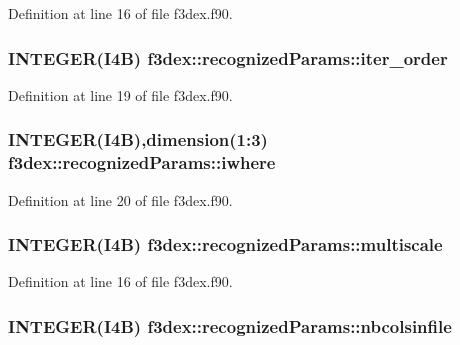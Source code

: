 Definition at line 16 of file f3dex.f90.

\hypertarget{typef3dex_1_1recognized_params_a2a6ce96f76b2a0313dfc8a7c2637664f}{
\subsubsection[{iter\_\-order}]{\setlength{\rightskip}{0pt plus 5cm}INTEGER(I4B) {\bf f3dex::recognizedParams::iter\_\-order}}}
\label{typef3dex_1_1recognized_params_a2a6ce96f76b2a0313dfc8a7c2637664f}


Definition at line 19 of file f3dex.f90.

\hypertarget{typef3dex_1_1recognized_params_a16f8233576af14a45b18864b87d0b165}{
\subsubsection[{iwhere}]{\setlength{\rightskip}{0pt plus 5cm}INTEGER(I4B),dimension(1:3) {\bf f3dex::recognizedParams::iwhere}}}
\label{typef3dex_1_1recognized_params_a16f8233576af14a45b18864b87d0b165}


Definition at line 20 of file f3dex.f90.

\hypertarget{typef3dex_1_1recognized_params_ab329ab9746c243c7826394dad56e130c}{
\subsubsection[{multiscale}]{\setlength{\rightskip}{0pt plus 5cm}INTEGER(I4B) {\bf f3dex::recognizedParams::multiscale}}}
\label{typef3dex_1_1recognized_params_ab329ab9746c243c7826394dad56e130c}


Definition at line 16 of file f3dex.f90.

\hypertarget{typef3dex_1_1recognized_params_a9d888847a809773b161086464c8aee37}{
\subsubsection[{nbcolsinfile}]{\setlength{\rightskip}{0pt plus 5cm}INTEGER(I4B) {\bf f3dex::recognizedParams::nbcolsinfile}}}
\label{typef3dex_1_1recognized_params_a9d888847a809773b161086464c8aee37}


